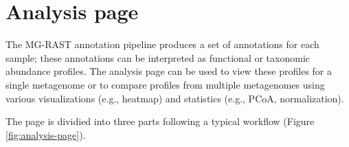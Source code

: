 \documentclass[12pt,fullpage]{report}
\begin{document}

\section{Analysis page}
\label{section:analysis-page}

The MG-RAST annotation pipeline produces a set of annotations for each sample; these annotations can be interpreted as functional or taxonomic abundance profiles. The analysis page can be used to view these profiles for a single metagenome or to compare profiles from multiple metagenomes using various visualizations (e.g., heatmap) and statistics (e.g., PCoA, normalization).

The page is dividied into three parts following a typical workflow (Figure \ref{fig:analysis-page}).
\end{document}
